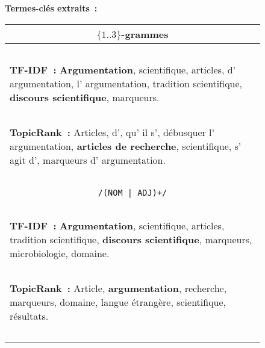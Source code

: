\begin{figure}
\begin{minipage}{\linewidth}
{{            \vspace{-0.5em}
            \textbf{Termes-clés extraits~:\\}
            \begin{tabular}{lll}
              \multicolumn{3}{c}{$\{1..3\}$-grammes}\\
              \hline~\vspace{-0.75em}\\
              \multicolumn{3}{p{.975\linewidth}}{\textbf{TF-IDF~:}
                \textbf{Argumentation},
                scientifique,
                articles,
                d' argumentation,
                l' argumentation,
                tradition scientifique,
                \textbf{discours scientifique},
                marqueurs.
              }\\~\vspace{-0.75em}\\
              \multicolumn{3}{p{.975\linewidth}}{\textbf{TopicRank~:}
                Articles,
                d',
                qu' il s',
                débusquer l' argumentation,
                \textbf{articles de recherche},
                scientifique,
                s' agit d',
                marqueurs d' argumentation.
              }\\~\vspace{-0.75em}\\
              \multicolumn{3}{c}{\texttt{/(NOM | ADJ)+/}}\\
              \hline~\vspace{-0.75em}\\
              \multicolumn{3}{p{.975\linewidth}}{\textbf{TF-IDF~:}
                \textbf{Argumentation},
                scientifique,
                articles,
                tradition scientifique,
                \textbf{discours scientifique},
                marqueurs,
                microbiologie,
                domaine.
              }\\~\vspace{-0.75em}\\
              \multicolumn{3}{p{.975\linewidth}}{\textbf{TopicRank~:}
                Article,
                \textbf{argumentation},
                recherche,
                marqueurs,
                domaine,
                langue étrangère,
                scientifique,
                résultats.
              }\\~\vspace{-0.75em}\\

\end{tabular}}}
\end{minipage}
\end{figure}
